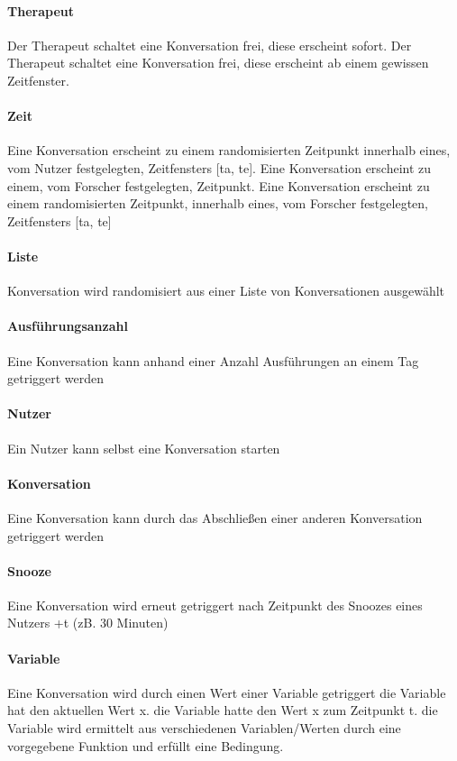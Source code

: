 \paragraph{Therapeut}Der Therapeut schaltet eine Konversation frei, diese erscheint sofort. 
Der Therapeut schaltet eine Konversation frei, diese erscheint ab einem gewissen Zeitfenster.

\paragraph{Zeit}Eine Konversation erscheint zu einem randomisierten Zeitpunkt innerhalb eines, vom Nutzer festgelegten, Zeitfensters [ta, te].
Eine Konversation erscheint zu einem, vom Forscher festgelegten, Zeitpunkt.
Eine Konversation erscheint zu einem randomisierten Zeitpunkt, innerhalb eines, vom Forscher festgelegten, Zeitfensters [ta, te]

\paragraph{Liste}Konversation wird randomisiert aus einer Liste von Konversationen ausgewählt

\paragraph{Ausführungsanzahl}Eine Konversation kann anhand einer Anzahl Ausführungen an einem Tag getriggert werden

\paragraph{Nutzer}Ein Nutzer kann selbst eine Konversation starten 

\paragraph{Konversation}Eine Konversation kann durch das Abschließen einer anderen Konversation getriggert werden

\paragraph{Snooze}Eine Konversation wird erneut getriggert nach Zeitpunkt des Snoozes eines Nutzers +t (zB. 30 Minuten)

\paragraph{Variable}Eine Konversation wird durch einen Wert einer Variable getriggert
die Variable hat den aktuellen Wert x.
die Variable hatte den Wert x zum Zeitpunkt t.
die Variable wird ermittelt aus verschiedenen Variablen/Werten durch eine vorgegebene Funktion und erfüllt eine Bedingung.

